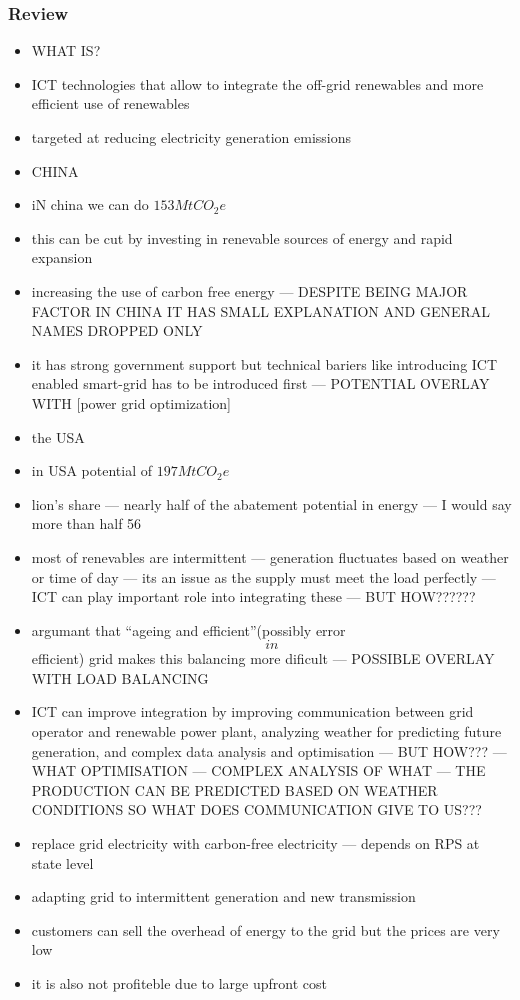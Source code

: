 \documentclass[11pt, twocolumn]{article}
\begin{document}
\subsubsection{Review}
\begin{itemize}
\item WHAT IS?
\item ICT technologies that allow to integrate the off-grid renewables and more efficient use of renewables
\item targeted at reducing electricity generation emissions


\item CHINA
\item iN china we can do $153 Mt CO_2e$
\item this can be cut by investing in renevable sources of energy and rapid expansion
\item increasing the use of carbon free energy --- DESPITE BEING MAJOR FACTOR IN CHINA IT HAS SMALL EXPLANATION AND GENERAL NAMES DROPPED ONLY
\item it has strong government support but technical bariers like introducing ICT enabled smart-grid has to be introduced first --- POTENTIAL OVERLAY WITH [power grid optimization]

\item the USA
\item in USA potential of $197 MtCO_2e$
\item lion's share --- nearly half of the abatement potential in energy --- I would say more than half 56%
\item most of renevables are intermittent --- generation fluctuates based on weather or time of day --- its an issue as the supply must meet the load perfectly --- ICT can play important role into integrating these --- BUT HOW??????
\item argumant that ``ageing and efficient''(possibly error \[in\]efficient) grid makes this balancing more dificult --- POSSIBLE OVERLAY WITH LOAD BALANCING
\item ICT can improve integration by improving communication between grid operator and renewable power plant, analyzing weather for predicting future generation, and complex data analysis and optimisation --- BUT HOW??? --- WHAT OPTIMISATION --- COMPLEX ANALYSIS OF WHAT --- THE PRODUCTION CAN BE PREDICTED BASED ON WEATHER CONDITIONS SO WHAT DOES COMMUNICATION GIVE TO US???
\item replace grid electricity with carbon-free electricity --- depends on RPS at state level
\item adapting grid to intermittent generation and new transmission
\item customers can sell the overhead of energy to the grid but the prices are very low
\item it is also not profiteble due to large upfront cost


\end{itemize}
\end{document}
